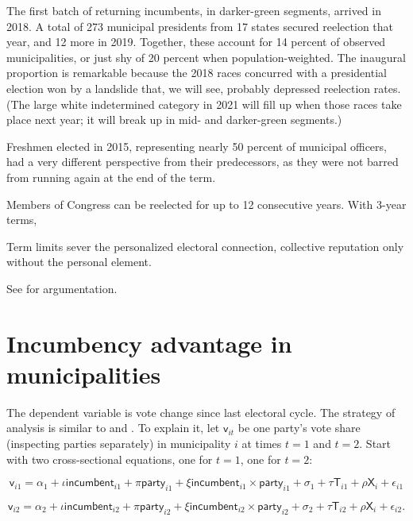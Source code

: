 \documentclass[letter,12pt]{article}
\newcommand{\vn}[1]{\vnform{#1}}      %
\newcommand{\vnform}[1]{\mathsf{#1}}  %
\begin{document}
The first batch of returning incumbents, in darker-green segments, arrived in 2018. A total of 273 municipal presidents from 17 states secured reelection that year, and 12 more in 2019. Together, these account for 14 percent of observed municipalities, or just shy of 20 percent when population-weighted. The inaugural proportion is remarkable because the 2018 races concurred with a presidential election won by a landslide that, we will see, probably depressed reelection rates. (The large white indetermined category in 2021 will fill up when those races take place next year; it will break up in mid- and darker-green segments.)

Freshmen elected in 2015, representing nearly 50 percent of municipal officers, had a very different perspective from their predecessors, as they were not barred from running again at the end of the term.  

Members of Congress can be reelected for up to 12 consecutive years. With 3-year terms, 

Term limits sever the personalized electoral connection, collective reputation only without the personal element.

See \citet{cain.etal.1987} for argumentation.

\section{Incumbency advantage in municipalities}

The dependent variable is vote change since last electoral cycle. The strategy of analysis is similar to \citet{levitt1994pacs} and \citet{cox.magar.1999}. To explain it, let $\vn{v}_{it}$ be one party's vote share (inspecting parties separately) in municipality $i$ at times $t=1$ and $t=2$. Start with two cross-sectional equations, one for $t=1$, one for $t=2$:

\begin{equation}
\vn{v}_{i1} = \alpha_1 + \iota \vn{incumbent}_{i1} + \pi \vn{party}_{i1} + \xi \vn{incumbent}_{i1} \times \vn{party}_{i1} + \sigma_1 + \tau \vn{T}_{i1} + \rho \vn{X}_i + \epsilon_{i1}
\end{equation}

\begin{equation}
\vn{v}_{i2} = \alpha_2 + \iota \vn{incumbent}_{i2} + \pi \vn{party}_{i2} + \xi \vn{incumbent}_{i2} \times \vn{party}_{i2} + \sigma_2 + \tau \vn{T}_{i2} + \rho \vn{X}_i + \epsilon_{i2}.
\end{equation}
\end{document}

